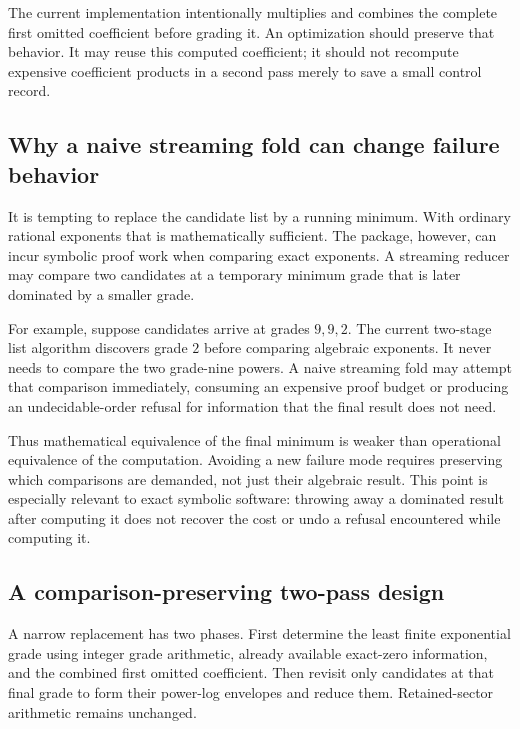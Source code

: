 \documentclass[11pt,letterpaper]{article}
\begin{document}
The current implementation intentionally multiplies and combines the complete first omitted coefficient before grading it. An optimization should preserve that behavior. It may reuse this computed coefficient; it should not recompute expensive coefficient products in a second pass merely to save a small control record.~\cite{flatops}

\subsection{Why a naive streaming fold can change failure behavior}
It is tempting to replace the candidate list by a running minimum. With ordinary rational exponents that is mathematically sufficient. The package, however, can incur symbolic proof work when comparing exact exponents. A streaming reducer may compare two candidates at a temporary minimum grade that is later dominated by a smaller grade.

For example, suppose candidates arrive at grades $9,9,2$. The current two-stage list algorithm discovers grade $2$ before comparing algebraic exponents. It never needs to compare the two grade-nine powers. A naive streaming fold may attempt that comparison immediately, consuming an expensive proof budget or producing an undecidable-order refusal for information that the final result does not need.

Thus mathematical equivalence of the final minimum is weaker than operational equivalence of the computation. Avoiding a new failure mode requires preserving which comparisons are demanded, not just their algebraic result. This point is especially relevant to exact symbolic software: throwing away a dominated result after computing it does not recover the cost or undo a refusal encountered while computing it.

\subsection{A comparison-preserving two-pass design}
A narrow replacement has two phases. First determine the least finite exponential grade using integer grade arithmetic, already available exact-zero information, and the combined first omitted coefficient. Then revisit only candidates at that final grade to form their power-log envelopes and reduce them. Retained-sector arithmetic remains unchanged.
\end{document}
